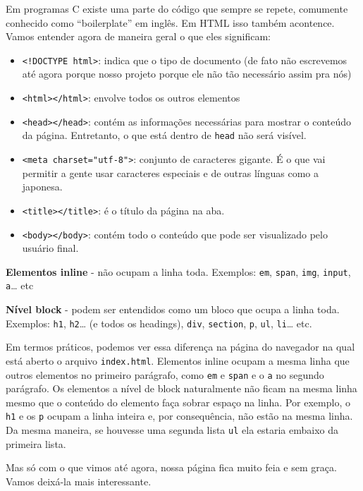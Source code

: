 Em programas C existe uma parte do código que sempre se repete, comumente conhecido como ``boilerplate'' em inglês. Em HTML isso também acontence. Vamos entender agora de maneira geral o que eles significam:

\begin{itemize}
\item
  \texttt{\textless{}!DOCTYPE\ html\textgreater{}}: indica que o tipo de
  documento (de fato não escrevemos até agora porque nosso projeto
  porque ele não tão necessário assim pra nós)
\item
  \texttt{\textless{}html\textgreater{}\textless{}/html\textgreater{}}:
  envolve todos os outros elementos
\item
  \texttt{\textless{}head\textgreater{}\textless{}/head\textgreater{}}:
  contém as informações necessárias para mostrar o conteúdo da página.
  Entretanto, o que está dentro de \texttt{head} não será visível.
\item
  \texttt{\textless{}meta\ charset="utf-8"\textgreater{}}: conjunto de
  caracteres gigante. É o que vai permitir a gente usar caracteres
  especiais e de outras línguas como a japonesa.
\item
  \texttt{\textless{}title\textgreater{}\textless{}/title\textgreater{}}:
  é o título da página na aba.
\item
  \texttt{\textless{}body\textgreater{}\textless{}/body\textgreater{}}:
  contém todo o conteúdo que pode ser visualizado pelo usuário final.
\end{itemize}

\textbf{Elementos inline} - não ocupam a linha toda. Exemplos:
\texttt{em}, \texttt{span}, \texttt{img}, \texttt{input},
\texttt{a}\ldots{} etc

\textbf{Nível block} - podem ser entendidos como um bloco que ocupa a
linha toda. Exemplos: \texttt{h1}, \texttt{h2}\ldots{} (e todos os
headings), \texttt{div}, \texttt{section}, \texttt{p}, \texttt{ul},
\texttt{li}\ldots{} etc.

Em termos práticos, podemos ver essa diferença na página do navegador na
qual está aberto o arquivo \texttt{index.html}. Elementos inline ocupam
a mesma linha que outros elementos no primeiro parágrafo, como
\texttt{em} e \texttt{span} e o \texttt{a} no segundo parágrafo. Os
elementos a nível de block naturalmente não ficam na mesma linha mesmo
que o conteúdo do elemento faça sobrar espaço na linha. Por exemplo, o
\texttt{h1} e os \texttt{p} ocupam a linha inteira e, por consequência,
não estão na mesma linha. Da mesma maneira, se houvesse uma segunda
lista \texttt{ul} ela estaria embaixo da primeira lista.

Mas só com o que vimos até agora, nossa página fica muito feia e sem
graça. Vamos deixá-la mais interessante.

